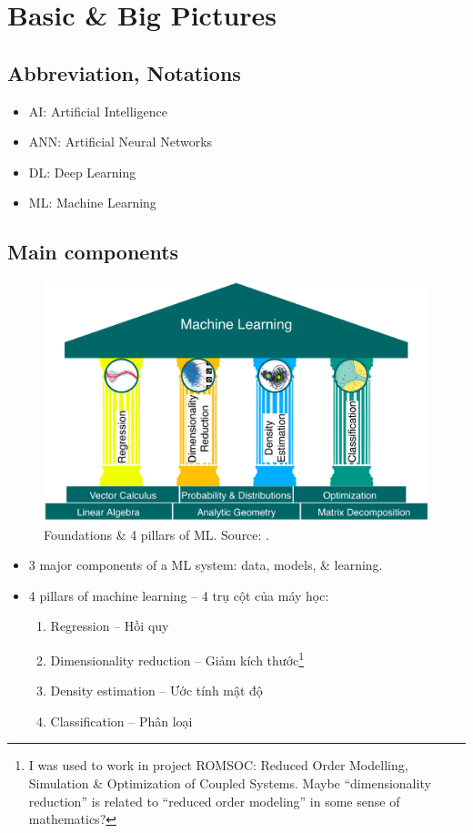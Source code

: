 \documentclass{article}
\begin{document}
\section{Basic \& Big Pictures}

\subsection{Abbreviation, Notations}

\begin{itemize}
	\item AI: Artificial Intelligence
	\item ANN: Artificial Neural Networks
	\item DL: Deep Learning
	\item ML: Machine Learning
\end{itemize}

\subsection{Main components}
\begin{figure}[H]
	\centering
	\includegraphics[width=12cm]{4_ML_pillars}
	\caption{Foundations \& 4 pillars of ML. Source: \cite[Fig. 1.1, p. 14]{Deisenroth_Faisal_Ong2024}.}
\end{figure}

\begin{itemize}
	\item 3 major components of a ML system: data, models, \& learning.
	\item 4 pillars of machine learning -- 4 trụ cột của máy học:
	\begin{enumerate}
		\item Regression -- Hồi quy
		\item Dimensionality reduction -- Giảm kích thước\footnote{I was used to work in project ROMSOC: Reduced Order Modelling, Simulation \& Optimization of Coupled Systems. Maybe ``dimensionality reduction'' is related to ``reduced order modeling'' in some sense of mathematics?}
		\item Density estimation -- Ước tính mật độ
		\item Classification -- Phân loại
	\end{enumerate}
\end{itemize}
\end{document}
